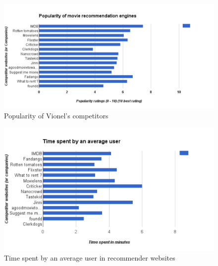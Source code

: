  \begin{figure}[htbp]
	\centering
		\includegraphics[scale=0.7]{Figures/competitor_popularity.pdf}
	\caption[Graph: Popularity rating of competitors in the area of movie recommendation system]{Popularity of Vionel's competitors \citep{popularity_online}}
	\label{fig: Popularity of competitors}
 \end{figure}

 \begin{figure}[htbp]
	\centering
		\includegraphics[scale=0.7]{Figures/fig_time_spent_each_recommender_site.pdf}
	\caption[Graph: Average time spent by an user in popular movie recommendation websites]{Time spent by an average user in recommender websites\citep{Alexa_imdb}}
	\label{fig: Time Spent by an average user}
 \end{figure}

  
